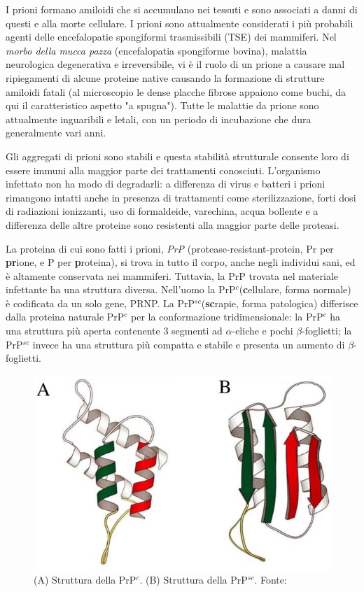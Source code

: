 \par I prioni formano amiloidi che si accumulano nei tessuti e sono associati a danni di questi e alla morte cellulare. I prioni sono attualmente considerati i più probabili agenti delle encefalopatie spongiformi trasmissibili (TSE) dei mammiferi. Nel \textit{morbo della mucca pazza} (encefalopatia spongiforme bovina), malattia neurologica degenerativa e irreversibile, vi è il ruolo di un prione a causare mal ripiegamenti di alcune proteine native causando la formazione di strutture amiloidi fatali (al microscopio le dense placche fibrose appaiono come buchi, da qui il caratteristico aspetto "a spugna"). Tutte le malattie da prione sono attualmente inguaribili e letali, con un periodo di incubazione che dura generalmente vari anni.

\par Gli aggregati di prioni sono stabili e questa stabilità strutturale consente loro di essere immuni alla maggior parte dei trattamenti conosciuti. L'organismo infettato non ha modo di degradarli: a differenza di virus e batteri i prioni rimangono intatti anche in presenza di trattamenti come sterilizzazione, forti dosi di radiazioni ionizzanti, uso di formaldeide, varechina, acqua bollente e a differenza delle altre proteine sono resistenti alla maggior parte delle proteasi.

\par La proteina di cui sono fatti i prioni, \textit{PrP} (protease-resistant-protein, Pr per \textbf{pr}ione, e P per \textbf{p}roteina), si trova in tutto il corpo, anche negli individui sani, ed è altamente conservata nei mammiferi. Tuttavia, la PrP trovata nel materiale infettante ha una struttura diversa. Nell'uomo la PrP$^{c}$(\textbf{c}ellulare, forma normale) è codificata da un solo gene, PRNP. La PrP$^{sc}$(\textbf{sc}rapie, forma patologica) differisce dalla proteina naturale PrP$^{c}$ per la conformazione tridimensionale: la PrP$^{c}$ ha una struttura più aperta contenente 3 segmenti ad $\alpha$-eliche e pochi $\beta$-foglietti; la PrP$^{sc}$ invece ha una struttura più compatta e stabile e presenta un aumento di $\beta$-foglietti.

\begin{figure}[h]
	\centering
	\includegraphics{images/PrPc.jpg}
	\caption{(A) Struttura della PrP$^{c}$. (B) Struttura della PrP$^{sc}$. Fonte: \cite{ruttkay2015prion}}
	\label{fig:PrPc}
\end{figure} 


